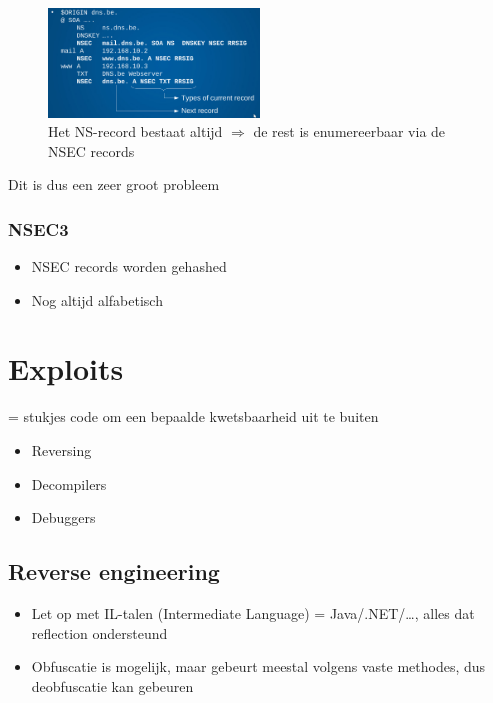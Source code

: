 \documentclass{article}
\begin{document}
\begin{figure}[H]
    \centering
    \includegraphics[width=0.5\textwidth]{nsec.png}
    \caption{Het NS-record bestaat altijd $\Rightarrow$ de rest is enumereerbaar via de NSEC records}
\end{figure}

Dit is dus een zeer groot probleem

\subsubsection{NSEC3}

\begin{itemize}
    \item NSEC records worden gehashed
    \item Nog altijd alfabetisch
\end{itemize}

\section{Exploits}

= stukjes code om een bepaalde kwetsbaarheid uit te buiten

\begin{itemize}
    \item Reversing 
    \item Decompilers
    \item Debuggers
\end{itemize}

\subsection{Reverse engineering}

\begin{itemize}
    \item Let op met IL-talen (Intermediate Language) = Java/.NET/\dots, alles dat reflection ondersteund
    \item Obfuscatie is mogelijk, maar gebeurt meestal volgens vaste methodes, dus deobfuscatie kan gebeuren 
\end{itemize}
\end{document}
